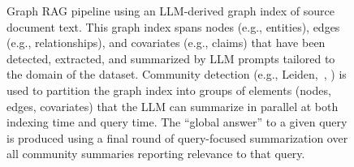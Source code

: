\begin{figure}
    \caption{
    Graph RAG pipeline using an LLM-derived graph index of source document text.
    This graph index spans nodes (e.g., entities), edges (e.g., relationships), and covariates (e.g., claims) that have been detected, extracted, and summarized by LLM prompts tailored to the domain of the dataset.
    Community detection (e.g., Leiden,~\citeauthor{Traag2019Leiden}, \citeyear{Traag2019Leiden}) is used to partition the graph index into groups of elements (nodes, edges, covariates) that the LLM can summarize in parallel at both indexing time and query time.
    The ``global answer'' to a given query is produced using a final round of query-focused summarization over all community summaries reporting relevance to that query.
    }
    \label{fig:pipeline}
\end{figure}
